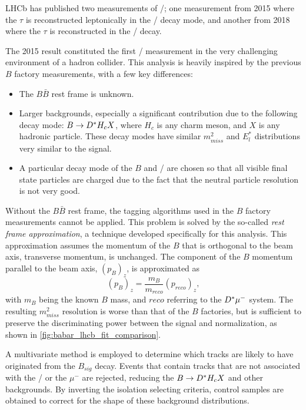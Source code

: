 LHCb has published two measurements of \RDst/; one measurement from 2015 where
the $\tau$ is reconstructed leptonically in the \TauLepMode/ decay mode, and
another from 2018 where the $\tau$ is reconstructed in the \TauHadMode/ decay.

The 2015 result constituted the first \RDst/ measurement in the very challenging
environment of a hadron collider.
This analysis is heavily inspired by the previous $B$ factory measurements, with
a few key differences:

\begin{itemize}
    \item The $B \bar{B}$ rest frame is unknown.
    \item Larger backgrounds, especially a significant contribution due to the
        following decay mode: $B \rightarrow \Dst/ H_c X$, where $H_c$ is any
        charm meson, and $X$ is any hadronic particle.
        These decay modes have similar $m^2_{miss}$ and $E^{*}_l$ distributions
        very similar to the signal.
    \item A particular decay mode of the $B$ and \Dst/ are chosen so that all
        visible final state particles are charged due to the fact that the
        neutral particle resolution is not very good.
\end{itemize}

Without the $B \bar{B}$ rest frame, the tagging algorithms used in the $B$
factory measurements cannot be applied.
This problem is solved by the so-called \emph{rest frame approximation}, a
technique developed specifically for this analysis.
This approximation assumes the momentum of the $B$ that is orthogonal to the
beam axis, transverse momentum, is unchanged.
The component of the $B$ momentum parallel to the beam axis, $(p_{B})_z$, is
approximated as
\begin{equation}
    (p_{B})_z = \frac{m_B}{m_{reco}} (p_{reco})_z,
\end{equation}
with $m_B$ being the known $B$ mass, and $reco$ referring to the $\Dst/ \mu^-$
system.
The resulting $m^2_{miss}$ resolution is worse than that of the $B$ factories,
but is sufficient to preserve the discriminating power between the signal and
normalization, as shown in \autoref{fig:babar_lhcb_fit_comparison}.

A multivariate method is employed to determine which tracks are likely to have
originated from the $B_{sig}$ decay.
Events that contain tracks that are not associated with the \Dst/ or the
$\mu^-$ are rejected, reducing the $B \rightarrow \Dst/ H_c X$ and other
backgrounds.
By inverting the isolation selecting criteria, control samples are obtained to
correct for the shape of these background distributions.

